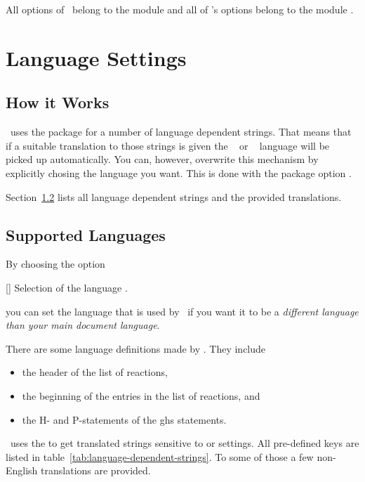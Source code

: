 \documentclass[load-preamble+]{cnltx-doc}
\begin{document}
All options of \chemformula\ belong to the module  and all
of \ghsystem's options belong to the module .


\section{Language Settings}\label{sec:languages}
\subsection{How it Works}
\chemmacros\ uses the  package for a number of language
dependent strings.  That means that if a suitable translation to those strings
is given the ~\cite{pkg:babel} or
~\cite{pkg:polyglossia} language will be picked up
automatically.  You can, however, overwrite this mechanism by explicitly
chosing the language you want.  This is done with the package option
.

Section~\ref{sec:supported-languages} lists all language dependent strings and
the provided translations.

\subsection{Supported Languages}\label{sec:supported-languages}
By choosing the option
\begin{commands}
  []
    Selection of the language .
\end{commands}
you can set the language that is used by \chemmacros\ if you want it to be a
\emph{different language than your main document language}.

There are some language definitions made by \chemmacros.  They include
\begin{itemize}
  \item the header of the list of reactions,
  \item the beginning of the entries in the list of reactions, and
  \item the H- and P-statements of the \ac{ghs} statements.
\end{itemize}

\chemmacros\ uses the  to get translated strings sensitive
to  or  settings.  All pre-defined
 keys are listed in
table~\ref{tab:language-dependent-strings}.  To some of those a few
non-English translations are provided.
\end{document}
